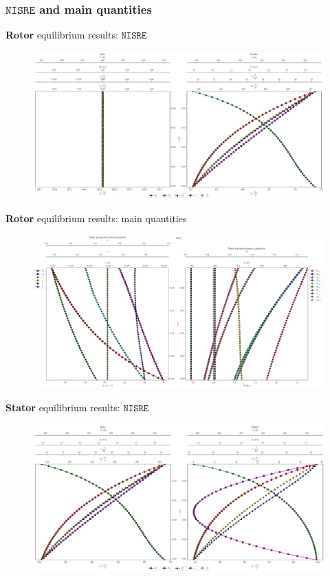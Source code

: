 	\subsubsection{$\mathtt{NISRE}$ and main quantities}
	\begin{frame}{\textbf{Rotor} equilibrium results: $\mathtt{NISRE}$}
		\begin{figure}
			\centering
			\includegraphics[width=1\textwidth]{figures/rotorEntropyFlow.pdf}
		\end{figure}
	\end{frame}
	
	\begin{frame}{\textbf{Rotor} equilibrium results: main quantities}
		\begin{figure}
			\centering
			\includegraphics[width=1\textwidth]{figures/rotorBetaThermo.pdf}
		\end{figure}
	\end{frame}
	
	\begin{frame}{\textbf{Stator} equilibrium results: $\mathtt{NISRE}$}
		\begin{figure}
			\centering
			\includegraphics[width=1\textwidth]{figures/statorEntropyFlow.pdf}
		\end{figure}
	\end{frame}
	
